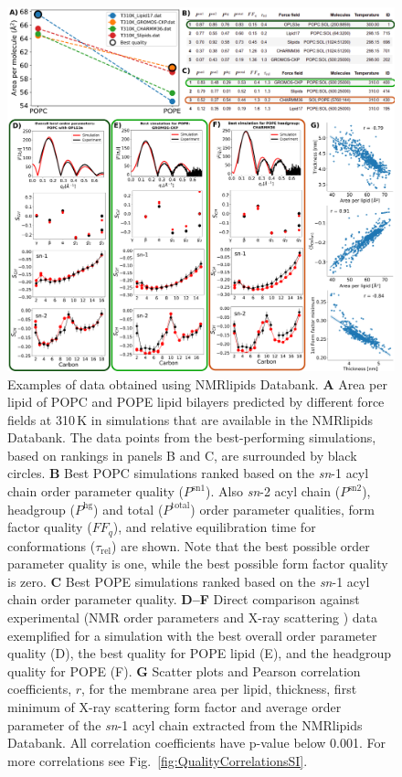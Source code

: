 \documentclass[fleqn,10pt]{wlscirep}
\begin{document}
\begin{figure}[!t]
    \centering
    \includegraphics[width=\linewidth]{Figures/quality5.pdf}
    \caption{Examples of data obtained using NMRlipids Databank. 
    \textbf{A} Area per lipid of POPC and POPE lipid bilayers predicted by different force fields at 310\,K in simulations that are available in the NMRlipids Databank. The data points from the best-performing simulations, based on rankings in panels B and C, are surrounded by black circles. 
    \textbf{B} Best POPC simulations ranked based on the \textit{sn}-1 acyl chain order parameter quality ($P^\mathrm{sn1}$). Also \textit{sn}-2 acyl chain ($P^\mathrm{sn2}$), headgroup ($P^\mathrm{hg}$) and total ($P^\mathrm{total}$) order parameter qualities, form factor quality ($FF_q$), and relative equilibration time for conformations ($\tau_\mathrm{rel}$) are shown. Note that the best possible order parameter quality is one, while the best possible form factor quality is zero.
    \textbf{C} Best POPE simulations ranked based on the \textit{sn}-1 acyl chain order parameter quality. 
    \textbf{D--F} Direct comparison against experimental (NMR order parameters and X-ray scattering ) data exemplified for a simulation with the best overall order parameter quality (D), the best quality for POPE lipid (E), and the headgroup quality for POPE (F).
    \textbf{G} Scatter plots and Pearson correlation coefficients, $r$, for the membrane area per lipid, thickness, first minimum of X-ray scattering form factor and average order parameter of the \textit{sn}-1 acyl chain extracted from the NMRlipids Databank. All correlation coefficients have p-value below 0.001. For more correlations see Fig.~\ref{fig:QualityCorrelationsSI}.
    }
    \label{fig:quality}
\end{figure}
\end{document}
